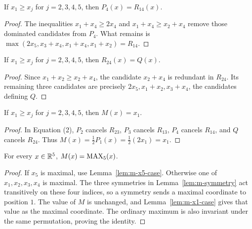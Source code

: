 \begin{lemma}[$P_4$ cancels $R_{14}$]
  \label{lem:p4-r14-x1-case}
  If $x_1\geq x_j$ for $j=2,3,4,5$, then $P_4(x)=R_{14}(x)$.
\end{lemma}
\begin{proof}
  The inequalities $x_1+x_4\geq2x_4$ and
  $x_1+x_4\geq x_2+x_4$ remove those dominated candidates from $P_4$.
  What remains is
  $\max(2x_5,x_3+x_4,x_1+x_4,x_1+x_2)=R_{14}$.
\end{proof}

\begin{lemma}[$R_{24}$ cancels $Q$]
  \label{lem:r24-q-x1-case}
  If $x_1\geq x_j$ for $j=2,3,4,5$, then $R_{24}(x)=Q(x)$.
\end{lemma}
\begin{proof}
  Since $x_1+x_2\geq x_2+x_4$, the candidate $x_2+x_4$ is redundant in
  $R_{24}$.  Its remaining three candidates are precisely
  $2x_5,x_1+x_2,x_3+x_4$, the candidates defining $Q$.
\end{proof}

\begin{lemma}
  \label{lem:m-x1-case}
  If $x_1\geq x_j$ for $j=2,3,4,5$, then $M(x)=x_1$.
\end{lemma}
\begin{proof}
  In Equation (2), $P_2$ cancels $R_{23}$, $P_3$ cancels $R_{13}$,
  $P_4$ cancels $R_{14}$, and $Q$ cancels $R_{24}$.  Thus
  $M(x)=\tfrac12P_1(x)=\tfrac12(2x_1)=x_1$.
\end{proof}

\begin{lemma}
  \label{lem:claim-four}
  For every $x\in\mathbb{R}^5$, $M(x)=\operatorname{MAX}_5(x)$.
\end{lemma}
\begin{proof}
  If $x_5$ is maximal, use Lemma~\ref{lem:m-x5-case}.  Otherwise one of
  $x_1,x_2,x_3,x_4$ is maximal.  The three symmetries in
  Lemma~\ref{lem:m-symmetry} act transitively on these four indices, so a
  symmetry sends a maximal coordinate to position $1$.  The value of $M$ is
  unchanged, and Lemma~\ref{lem:m-x1-case} gives that value as the maximal
  coordinate.  The ordinary maximum is also invariant under the same
  permutation, proving the identity.
\end{proof}

